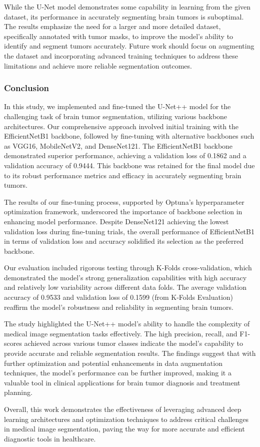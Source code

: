 While the U-Net model demonstrates some capability in learning from the given dataset, its performance in accurately segmenting brain tumors is suboptimal. The results emphasize the need for a larger and more detailed dataset, specifically annotated with tumor masks, to improve the model's ability to identify and segment tumors accurately. Future work should focus on augmenting the dataset and incorporating advanced training techniques to address these limitations and achieve more reliable segmentation outcomes.


\subsubsection{Conclusion}\label{s:conclusion}

In this study, we implemented and fine-tuned the U-Net++ model for the challenging task of brain tumor segmentation, utilizing various backbone architectures. Our comprehensive approach involved initial training with the EfficientNetB1 backbone, followed by fine-tuning with alternative backbones such as VGG16, MobileNetV2, and DenseNet121. The EfficientNetB1 backbone demonstrated superior performance, achieving a validation loss of 0.1862 and a validation accuracy of 0.9444. This backbone was retained for the final model due to its robust performance metrics and efficacy in accurately segmenting brain tumors.

The results of our fine-tuning process, supported by Optuna's hyperparameter optimization framework, underscored the importance of backbone selection in enhancing model performance. Despite DenseNet121 achieving the lowest validation loss during fine-tuning trials, the overall performance of EfficientNetB1 in terms of validation loss and accuracy solidified its selection as the preferred backbone.

Our evaluation included rigorous testing through K-Folds cross-validation, which demonstrated the model's strong generalization capabilities with high accuracy and relatively low variability across different data folds. The average validation accuracy of 0.9533 and validation loss of 0.1599 (from K-Folds Evaluation) reaffirm the model's robustness and reliability in segmenting brain tumors.

The study highlighted the U-Net++ model's ability to handle the complexity of medical image segmentation tasks effectively. The high precision, recall, and F1-scores achieved across various tumor classes indicate the model's capability to provide accurate and reliable segmentation results. The findings suggest that with further optimization and potential enhancements in data augmentation techniques, the model's performance can be further improved, making it a valuable tool in clinical applications for brain tumor diagnosis and treatment planning.

Overall, this work demonstrates the effectiveness of leveraging advanced deep learning architectures and optimization techniques to address critical challenges in medical image segmentation, paving the way for more accurate and efficient diagnostic tools in healthcare.

